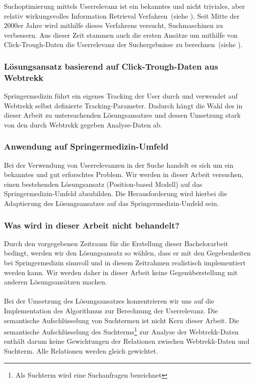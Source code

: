 Suchoptimierung mittels Userrelevanz ist ein bekanntes und nicht triviales, aber relativ wirkungsvolles Information Retrieval Verfahren~(siehe \cite{IWUSBI}). Seit Mitte der 2000er Jahre wird mithilfe dieses Verfahrens versucht, Suchmaschinen zu verbessern. Aus dieser Zeit stammen auch die ersten Ansätze um mithilfe von Click-Trough-Daten die Userrelevanz der Suchergebnisse zu berechnen~(siehe \cite{Joachims}).

\subsubsection{Lösungsansatz basierend auf Click-Trough-Daten aus Webtrekk}
\label{sec:Einfuehrung:ZielArbeit:AbbildungSpringermedizinUmfeld:Loesungsansatz}

Springermedizin führt ein eigenes Tracking der User durch und verwendet auf Webtrekk selbst definierte Tracking-Parameter. Dadurch hängt die Wahl des in dieser Arbeit zu untersuchenden Lösungsansatzes und dessen Umsetzung stark von den durch Webtrekk gegeben Analyse-Daten ab.

\subsubsection{Anwendung auf Springermedizin-Umfeld}
\label{sec:Einfuehrung:ZielArbeit:AbbildungSpringermedizinUmfeld:Adaptierung}

Bei der Verwendung von Userrelevanzen in der Suche handelt es sich um ein bekanntes und gut erforschtes Problem. Wir werden in dieser Arbeit versuchen, einen bestehenden Lösungsansatz (Position-based Modell) auf das Springermedizin-Umfeld abzubilden. Die Herausforderung wird hierbei die Adaptierung des Lösungsansatzes auf das Springermedizin-Umfeld sein.

\subsubsection{Was wird in dieser Arbeit nicht behandelt?}
\label{sec:Einfuehrung:ZielArbeit:AbbildungSpringermedizinUmfeld:NichtBehandeln}

Durch den vorgegebenen Zeitraum für die Erstellung dieser Bachelorarbeit bedingt, werden wir den Lösungsansatz so wählen, dass er mit den Gegebenheiten bei Springermedizin sinnvoll und in diesem Zeitrahmen realistisch implementiert werden kann. Wir werden daher in dieser Arbeit keine Gegenüberstellung mit anderen Lösungsansätzen machen. 
\\
\\
Bei der Umsetzung des Lösungsansatzes konzentrieren wir uns auf die Implementation des Algorithmus zur Berechnung der Userrelevanz. Die semantische Aufschlüsselung von Suchtermen ist nicht Kern dieser Arbeit. Die semantische Aufschlüsselung des Suchterms\footnote{Als Suchterm wird eine Suchanfragen bezeichnet} zur Analyse der Webtrekk-Daten enthält darum keine Gewichtungen der Relationen zwischen Webtrekk-Daten und Suchterm. Alle Relationen werden gleich gewichtet. 

